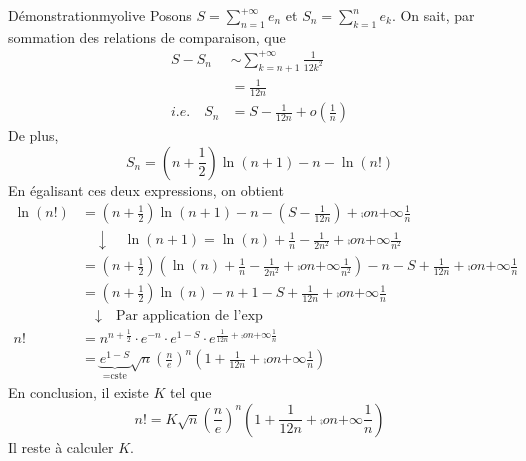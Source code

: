 \begin{demo}{Démonstration}{myolive}
            Posons $S = \sum_{n=1}^{+\infty} e_n$ et $S_n = \sum_{k=1}^{n} e_k$. On sait, par sommation des relations de comparaison, que 
            \begin{align*}
                S - S_n
                &\sim \sum_{k=n+1}^{+\infty} \frac{1}{12 k^2} \\
                &= \frac{1}{12n} \\
                \textit{i.e.} \quad S_n 
                &= S - \frac{1}{12n} + o\left(\frac{1}{n}\right) 
            \end{align*}
            De plus, 
            \[ S_n = \left(n + \frac{1}{2}\right)\ln(n+1) - n - \ln(n!) \] 
            En égalisant ces deux expressions, on obtient 
            \begin{align*}
                \ln(n!) 
                &= \left( n+\frac{1}{2} \right)\ln(n+1) - n - \left( S - \frac{1}{12n} \right) + \comp{o}{n}{+\infty}{\frac{1}{n}} \\
                &\quad \downarrow \quad \ln(n+1) = \ln(n) + \frac{1}{n} - \frac{1}{2n^2} + \comp{o}{n}{+\infty}{\frac{1}{n^2}} \\
                &= \left( n+\frac{1}{2} \right) \left( \ln(n) + \frac{1}{n} - \frac{1}{2n^2} + \comp{o}{n}{+\infty}{\frac{1}{n^2}} \right) - n - S + \frac{1}{12n} + \comp{o}{n}{+\infty}{\frac{1}{n}} \\
                &= \left( n+\frac{1}{2} \right)\ln(n) - n  + 1 - S + \frac{1}{12n} + \comp{o}{n}{+\infty}{\frac{1}{n}} \\
                &\quad \downarrow \quad \text{Par application de l’exp} \\
                n! 
                &= n^{n + \frac{1}{2}} \cdot e^{-n} \cdot e^{1-S} \cdot e^{\frac{1}{12n} + \comp{o}{n}{+\infty}{\frac{1}{n}}} \\
                &= \underbrace{e^{1-S}}_{= \text{cste}} \sqrt{n} \left( \frac{n}{e} \right)^n \left( 1 + \frac{1}{12n} + \comp{o}{n}{+\infty}{\frac{1}{n}} \right)
            \end{align*}
            En conclusion, il existe $K$ tel que 
            \[ n! = K \sqrt{n} \left( \frac{n}{e} \right)^n \left( 1 + \frac{1}{12n} + \comp{o}{n}{+\infty}{\frac{1}{n}} \right) \] 
            Il reste à calculer $K$. 
    

\end{demo}
